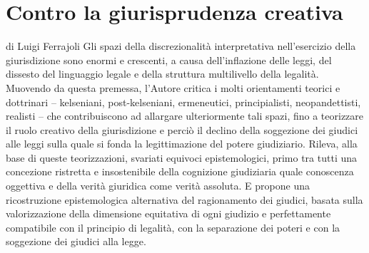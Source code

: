 \section{Contro la giurisprudenza creativa}%
di Luigi Ferrajoli
Gli spazi della discrezionalità interpretativa nell’esercizio della giurisdizione sono enormi e crescenti, a causa dell’inflazione delle leggi, del dissesto del linguaggio legale e della struttura multilivello della legalità. Muovendo da questa premessa, l’Autore critica i molti orientamenti teorici e dottrinari – kelseniani, post-kelseniani, ermeneutici, principialisti, neopandettisti, realisti – che contribuiscono ad allargare ulteriormente tali spazi, fino a teorizzare il ruolo creativo della giurisdizione e perciò il declino della soggezione dei giudici alle leggi sulla quale si fonda la legittimazione del potere giudiziario. Rileva, alla base di queste teorizzazioni, svariati equivoci epistemologici, primo tra tutti una concezione ristretta e insostenibile della cognizione giudiziaria quale conoscenza oggettiva e della verità giuridica come verità assoluta. E propone una ricostruzione epistemologica alternativa del ragionamento dei giudici, basata sulla valorizzazione della dimensione equitativa di ogni giudizio e perfettamente compatibile con il principio di legalità, con la separazione dei poteri e con la soggezione dei giudici alla legge.

